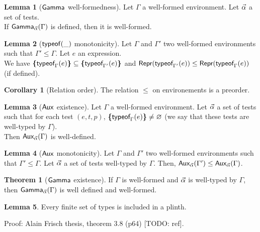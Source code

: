 \documentclass[a4paper]{article}
\theoremstyle{definition}
\newtheorem{theorem}{Theorem}
\newtheorem{lemma}{Lemma}
\newtheorem{corollary}{Corollary}
\begin{document}
        \begin{lemma}[$\textsf{Gamma}_{} $ well-formedness]
          Let $\Gamma$ a well-formed environment. Let $\vec \alpha$ a set of tests.\\
          If $\textsf{Gamma}_{\vec \alpha}(\Gamma)$ is defined, then it is well-formed.
        \end{lemma}

        \begin{lemma}[$\textsf{typeof}_{}(\_)$ monotonicity]
          Let $\Gamma$ and $\Gamma'$ two well-formed environments such that $\Gamma' \leq \Gamma$.
          Let $e$ an expression.\\
          We have $\textbf{\textup{\{}}\textsf{typeof}_{\Gamma}(e)\textbf{\textup{\}}} \subseteq \textbf{\textup{\{}}\textsf{typeof}_{\Gamma'}(e)\textbf{\textup{\}}}$ and
          $\textsf{Repr}(\textsf{typeof}_{\Gamma'}(e)) \leq \textsf{Repr}(\textsf{typeof}_{\Gamma}(e))$ (if defined).
        \end{lemma}

        \begin{corollary}[Relation order]
          The relation $\leq$ on environements is a preorder.
        \end{corollary}

        \begin{lemma}[$\textsf{Aux}_{} $ existence]
          Let $\Gamma$ a well-formed environment.
          Let $\vec \alpha$ a set of tests such that for each test $(e,t,p)$, $\textbf{\textup{\{}}\textsf{typeof}_{\Gamma}(e)\textbf{\textup{\}}} \neq \varnothing$
          (we say that these tests are well-typed by $\Gamma$).\\
          Then $\textsf{Aux}_{\vec \alpha}(\Gamma)$ is well-defined.
        \end{lemma}

        \begin{lemma}[$\textsf{Aux}_{}$ monotonicity]
          Let $\Gamma$ and $\Gamma'$ two well-formed environments such that $\Gamma' \leq \Gamma$.
          Let $\vec \alpha$ a set of tests well-typed by $\Gamma$. Then, $\textsf{Aux}_{\vec \alpha}(\Gamma') \leq \textsf{Aux}_{\vec \alpha}(\Gamma)$.
        \end{lemma}

        \begin{theorem}[$\textsf{Gamma}_{}$ existence]
            If $\Gamma$ is well-formed and $\vec \alpha$ is well-typed by $\Gamma$, then $\textsf{Gamma}_{\vec \alpha}(\Gamma)$ is well defined and well-formed.
        \end{theorem}

        \begin{lemma}
          Every finite set of types is included in a plinth.
        \end{lemma}
        Proof: Alain Frisch thesis, theorem 3.8 (p64) [TODO: ref].
\end{document}
